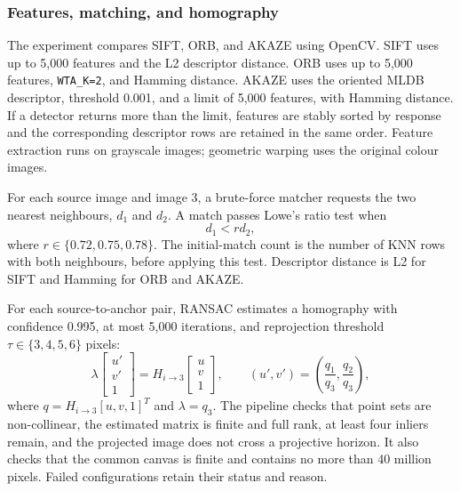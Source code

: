 \documentclass[a4paper,12pt]{article}
\begin{document}
\subsubsection{Features, matching, and homography}
The experiment compares SIFT, ORB, and AKAZE using OpenCV. SIFT uses up to 5,000 features and the L2 descriptor distance. ORB uses up to 5,000 features, \texttt{WTA\_K=2}, and Hamming distance. AKAZE uses the oriented MLDB descriptor, threshold 0.001, and a limit of 5,000 features, with Hamming distance. If a detector returns more than the limit, features are stably sorted by response and the corresponding descriptor rows are retained in the same order. Feature extraction runs on grayscale images; geometric warping uses the original colour images.

For each source image and image 3, a brute-force matcher requests the two nearest neighbours, $d_1$ and $d_2$. A match passes Lowe's ratio test when
\begin{equation}
d_1 < r d_2,
\end{equation}
where $r\in\{0.72,0.75,0.78\}$. The initial-match count is the number of KNN rows with both neighbours, before applying this test. Descriptor distance is L2 for SIFT and Hamming for ORB and AKAZE.

For each source-to-anchor pair, RANSAC estimates a homography with confidence 0.995, at most 5,000 iterations, and reprojection threshold $\tau\in\{3,4,5,6\}$ pixels:
\begin{equation}
\lambda\begin{bmatrix}u'\\v'\\1\end{bmatrix}
=H_{i\rightarrow3}\begin{bmatrix}u\\v\\1\end{bmatrix},
\qquad (u',v')=\left(\frac{q_1}{q_3},\frac{q_2}{q_3}\right),
\end{equation}
where $q=H_{i\rightarrow3}[u,v,1]^T$ and $\lambda=q_3$. The pipeline checks that point sets are non-collinear, the estimated matrix is finite and full rank, at least four inliers remain, and the projected image does not cross a projective horizon. It also checks that the common canvas is finite and contains no more than 40 million pixels. Failed configurations retain their status and reason.
\end{document}
